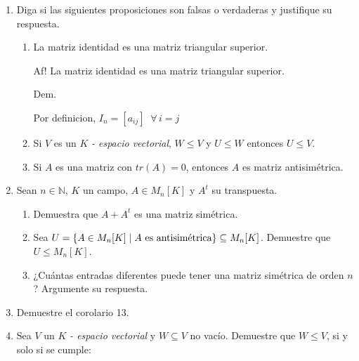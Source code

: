 \documentclass[fleqn]{article}
\begin{document}
    \begin{enumerate}
        \item Diga si las siguientes proposiciones son falsas o verdaderas y justifique su respuesta.
    
        \begin{enumerate}
            \item La matriz identidad es una matriz triangular superior. \par
            Af! La matriz identidad es una matriz triangular superior. \par
            \hspace{2.7mm}Dem.\par
            Por definicion, $ I_n = [a_{ij}] \;\; \forall \, i = j $



            \item Si $ V $ es un $ K $ \textsl{- espacio vectorial}, $ W \leq V $ y $ U \leq W $ entonces $ U \leq V $.
            
            \item Si $ A $ es una matriz con $ tr(A) = 0 $, entonces $ A $ es matriz antisimétrica. 
        \end{enumerate}

        \item Sean $ n \in \mathbb{N} $, $ K $ un campo, $ A \in M_n[K] $ y $ A^t $ su transpuesta.
        
        \begin{enumerate}
            \item Demuestra que $ A + A^t $ es una matriz simétrica.
            
            \item Sea $ U = \left \{A \in M_n [K] \; \middle \arrowvert \; A \text{ es antisimétrica} \right \} \subseteq M_n [K] $. Demuestre que $ U \leq M_n[K] $.
            
            \item ¿Cuántas entradas diferentes puede tener una matriz simétrica de orden $ n $? Argumente su respuesta.
        \end{enumerate}

        \item Demuestre el corolario 13.
        
        \item Sea $ V $ un $ K $ \textsl{- espacio vectorial} y $ W \subseteq V $ no vacío. Demuestre que $ W \leq V $, si y solo si se cumple:
        

\end{enumerate}
\end{document}
